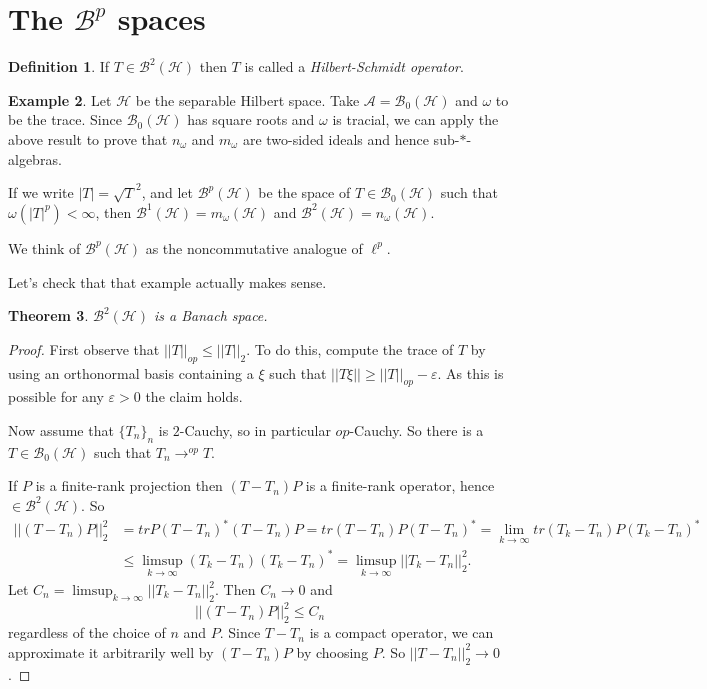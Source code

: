 \documentclass[12pt]{report}
\newcommand{\AAA}{\mathcal A}
\newcommand{\BB}{\mathcal B}
\newcommand{\HH}{\mathcal H}
\newcommand{\dfn}[1]{\emph{#1}\index{#1}}
\newtheorem{theorem}{Theorem}[chapter]
\theoremstyle{definition}
\newtheorem{definition}[theorem]{Definition}
\newtheorem{example}[theorem]{Example}
\begin{document}
\section{The $\BB^p$ spaces}
\begin{definition}
    If $T \in \BB^2(\HH)$ then $T$ is called a \dfn{Hilbert-Schmidt operator}.
\end{definition}
\begin{example}
    Let $\HH$ be the separable Hilbert space. Take $\AAA = \BB_0(\HH)$ and $\omega$ to be the trace. Since $\BB_0(\HH)$ has square roots and $\omega$ is tracial, we can apply the above result to prove that $n_\omega$ and $m_\omega$ are two-sided ideals and hence sub-$*$-algebras.
    
    If we write $|T| = \sqrt T^2$, and let $\BB^p(\HH)$ be the space of $T \in \BB_0(\HH)$ such that $\omega(|T|^p) < \infty$, then $\BB^1(\HH) = m_\omega(\HH)$ and $\BB^2(\HH) = n_\omega(\HH)$.
    
    We think of $\BB^p(\HH)$ as the noncommutative analogue of $\ell^p$.
\end{example}
Let's check that that example actually makes sense.
\begin{theorem}
    $\BB^2(\HH)$ is a Banach space.
\end{theorem}
\begin{proof}
    First observe that $||T||_{op} \leq ||T||_2$. To do this, compute the trace of $T$ by using an orthonormal basis containing a $\xi$ such that $||T\xi|| \geq ||T||_{op} - \varepsilon$. As this is possible for any $\varepsilon > 0$ the claim holds.
    
    Now assume that $\{T_n\}_n$ is $2$-Cauchy, so in particular $op$-Cauchy. So there is a $T \in \BB_0(\HH)$ such that $T_n \to^{op} T$.
    
    If $P$ is a finite-rank projection then $(T-T_n)P$ is a finite-rank operator, hence $\in \BB^2(\HH)$. So
\begin{align*}
    ||(T-T_n)P||_2^2
        &= tr P(T-T_n)^*(T-T_n)P
        = tr (T-T_n)P(T-T_n)^*
        = \lim_{k \to \infty} tr (T_k-T_n)P(T_k -T_n)^*\\
        &\leq \limsup_{k \to \infty} (T_k-T_n)(T_k-T_n)^*
        = \limsup_{k \to \infty} ||T_k-T_n||_2^2.
\end{align*}
Let $C_n = \limsup_{k \to \infty} ||T_k-T_n||_2^2$. Then $C_n \to 0$ and
$$||(T-T_n)P||_2^2 \leq C_n$$
regardless of the choice of $n$ and $P$. Since $T-T_n$ is a compact operator, we can approximate it arbitrarily well by $(T-T_n)P$ by choosing $P$. So $||T-T_n||_2^2 \to 0$.
\end{proof}
\end{document}
